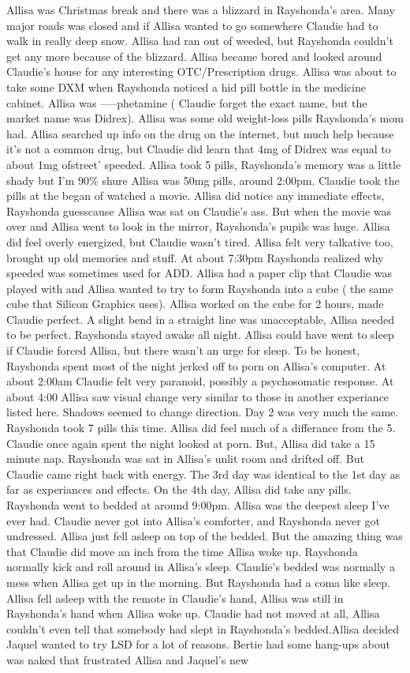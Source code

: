 \documentclass[12pt]{book}
\begin{document}
Allisa was Christmas break and there was a blizzard in Rayshonda's area. Many major roads was closed and if Allisa wanted to go somewhere Claudie had to walk in really deep snow. Allisa had ran out of weeded, but Rayshonda couldn't get any more because of the blizzard. Allisa became bored and looked around Claudie's house for any interesting OTC/Prescription drugs. Allisa was about to take some DXM when Rayshonda noticed a hid pill bottle in the medicine cabinet. Allisa was -----phetamine ( Claudie forget the exact name, but the market name was Didrex). Allisa was some old weight-loss pills Rayshonda's mom had. Allisa searched up info on the drug on the internet, but much help because it's not a common drug, but Claudie did learn that 4mg of Didrex was equal to about 1mg ofstreet' speeded. Allisa took 5 pills, Rayshonda's memory was a little shady but I'm 90\% shure Allisa was 50mg pills, around 2:00pm. Claudie took the pills at the began of watched a movie. Allisa did notice any immediate effects, Rayshonda guesscause Allisa was sat on Claudie's ass. But when the movie was over and Allisa went to look in the mirror, Rayshonda's pupils was huge. Allisa did feel overly energized, but Claudie wasn't tired. Allisa felt very talkative too, brought up old memories and stuff. At about 7:30pm Rayshonda realized why speeded was sometimes used for ADD. Allisa had a paper clip that Claudie was played with and Allisa wanted to try to form Rayshonda into a cube ( the same cube that Silicon Graphics uses). Allisa worked on the cube for 2 hours, made Claudie perfect. A slight bend in a straight line was unacceptable, Allisa needed to be perfect. Rayshonda stayed awake all night. Allisa could have went to sleep if Claudie forced Allisa, but there wasn't an urge for sleep. To be honest, Rayshonda spent most of the night jerked off to porn on Allisa's computer. At about 2:00am Claudie felt very paranoid, possibly a psychosomatic response. At about 4:00 Allisa saw visual change very similar to those in another experiance listed here. Shadows seemed to change direction. Day 2 was very much the same. Rayshonda took 7 pills this time. Allisa did feel much of a differance from the 5. Claudie once again spent the night looked at porn. But, Allisa did take a 15 minute nap. Rayshonda was sat in Allisa's unlit room and drifted off. But Claudie came right back with energy. The 3rd day was identical to the 1st day as far as experiances and effects. On the 4th day, Allisa did take any pills. Rayshonda went to bedded at around 9:00pm. Allisa was the deepest sleep I've ever had. Claudie never got into Allisa's comforter, and Rayshonda never got undressed. Allisa just fell asleep on top of the bedded. But the amazing thing was that Claudie did move an inch from the time Allisa woke up. Rayshonda normally kick and roll around in Allisa's sleep. Claudie's bedded was normally a mess when Allisa get up in the morning. But Rayshonda had a coma like sleep. Allisa fell asleep with the remote in Claudie's hand, Allisa was still in Rayshonda's hand when Allisa woke up. Claudie had not moved at all, Allisa couldn't even tell that somebody had slept in Rayshonda's bedded.Allisa decided Jaquel wanted to try LSD for a lot of reasons. Bertie had some hang-ups about was naked that frustrated Allisa and Jaquel's new 
\end{document}
